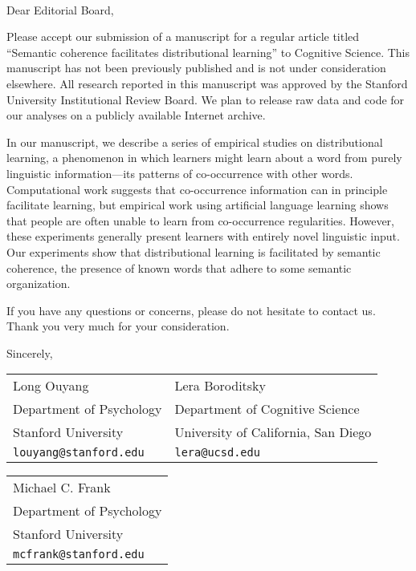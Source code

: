\documentclass{letter}
\begin{document}
\address{450 Serra Mall \\ Building 420 (Jordan Hall) \\ Stanford, CA~~94305}


\pagestyle{empty}
\begin{letter}{~~~}
\opening{Dear Editorial Board,}

Please accept our submission of a manuscript for a regular article titled ``Semantic coherence facilitates distributional learning'' to Cognitive Science. This manuscript has not been previously published and is not under consideration elsewhere. All research reported in this manuscript was approved by the Stanford University Institutional Review Board. We plan to release raw data and code for our analyses on a publicly available Internet archive.

In our manuscript, we describe a series of empirical studies on distributional learning, a phenomenon in which learners might learn about a word from purely linguistic information---its patterns of co-occurrence with other words. Computational work suggests that co-occurrence information can in principle facilitate learning, but empirical work using artificial language learning shows that people are often unable to learn from co-occurrence regularities. However, these experiments generally present learners with entirely novel linguistic input. Our experiments show that distributional learning is facilitated by semantic coherence, the presence of known words that adhere to some semantic organization.



If you have any questions or concerns, please do not hesitate to contact us. Thank you very much for your consideration.


\vspace{2\parskip}
Sincerely,\\

\begin{tabularx}{\textwidth}{X l}
Long Ouyang & Lera Boroditsky\\
Department of Psychology & Department of Cognitive Science\\
Stanford University & University of California, San Diego\\
\texttt{louyang@stanford.edu} & \texttt{lera@ucsd.edu}\\
\end{tabularx}

\begin{tabular}{l}
Michael C. Frank\\
Department of Psychology\\
Stanford University\\
\texttt{mcfrank@stanford.edu}
\end{tabular}

\end{letter}
\end{document}
